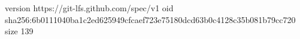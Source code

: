 version https://git-lfs.github.com/spec/v1
oid sha256:6b0111040ba1c2ed625949cfcaef723e75180dcd63b0c4128c35b081b79cc720
size 139
